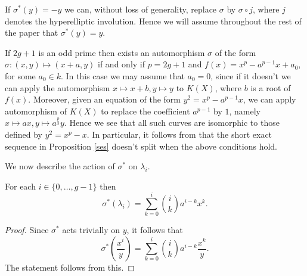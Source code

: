     \begin{rem}
    If $\sigma^*(y) = -y$ we can, without loss of generality, replace $\sigma$ by $\sigma \circ j$, where $j$ denotes the hyperelliptic involution.
    Hence we will assume throughout the rest of the paper that $\sigma^*(y) = y$.
    \end{rem}

    \begin{ex}
    If $2g+1$ is an odd prime then exists an automorphism $\sigma$ of the form $\sigma\colon (x,y) \mapsto (x+a,y)$ if and only if $p=2g+1$ and $f(x) = x^p - a^{p-1}x + a_0$, for some $a_0 \in k$.
    In this case we may assume that $a_0 = 0$, since if it doesn't we can apply the automorphism $x \mapsto x+b, y\mapsto y$ to $K(X)$, where $b$ is a root of $f(x)$.
    Moreover, given an equation of the form $y^2 = x^p - a^{p-1}x$, we can apply automorphism of $K(X)$ to replace the coefficient $a^{p-1}$ by $1$, namely $x \mapsto ax, y \mapsto a^{\frac{p}{2}}y$.
    Hence we see that all such curves are isomorphic to those defined by $y^2 = x^p - x$.
    In particular, it follows from \cite{canonicalrepresentation} that the short exact sequence in Proposition \ref{ses} doesn't split when the above conditions hold.
    \end{ex}


We now describe the action of $\sigma^*$ on $\lambda_i$.
    
    \begin{lem}
    For each $i \in \{ 0, \ldots, g-1\}$ then 
        \[
        \sigma^*(\lambda_i) = \sum_{k = 0}^i \binom{i}{k}a^{i-k}x^k.
        \]
    \end{lem}
    \begin{proof}
    Since $\sigma^*$ acts trivially on $y$, it follows that
        \[
        \sigma^*\left( \frac{x^i}{y} \right) = \sum_{k=0}^i \binom{i}{k}a^{i-k}\frac{x^k}{y}.
        \]
    The statement follows from this.
    \end{proof}


